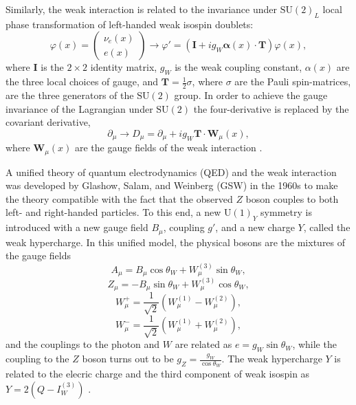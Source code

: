 Similarly, the weak interaction is related to the invariance under $\text{SU}(2)_L$ local
phase transformation of left-handed weak isospin doublets:
\begin{equation}
\varphi(x) = \begin{pmatrix} \nu_e(x) \\ e(x) \end{pmatrix} \rightarrow
\varphi' = (\mathbf{I} + i g_W \mathbf{\alpha}(x)\cdot\mathbf{T}) \varphi(x),
\end{equation}
where $\mathbf{I}$ is the $2\times2$ identity matrix, $g_W$ is the weak coupling constant,
$\alpha(x)$ are the three local choices of gauge, and $\mathbf{T} = \frac{1}{2}\sigma$,
where $\sigma$ are the Pauli spin-matrices, are the three generators of the $\text{SU}(2)$ group.
In order to achieve the gauge invariance of the Lagrangian under $\text{SU}(2)$ the four-derivative
is replaced by the covariant derivative,
\begin{equation}
\partial_\mu \rightarrow D_\mu = \partial_\mu + i g_W \mathbf{T} \cdot \mathbf{W}_\mu(x),
\end{equation}
where $\mathbf{W}_\mu(x)$ are the gauge fields of the weak interaction \cite{Thomson:2013zua}.

A unified theory of quantum electrodynamics (QED) and the weak interaction was developed
by Glashow, Salam, and Weinberg (GSW) in the 1960s \cite{Thomson:2013zua} to make the
theory compatible with the fact that the observed $Z$ boson couples to both left- and
right-handed particles. To this end, a new $\text{U}(1)_Y$ symmetry is introduced with a new gauge
field $B_\mu$, coupling $g'$, and a new charge $Y$, called the weak hypercharge. In this unified model,
the physical bosons are the mixtures of the gauge fields
\begin{equation}
A_\mu = B_\mu \cos\theta_W + W_\mu^{(3)} \sin{\theta_W},
\end{equation}
\begin{equation}
Z_\mu = - B_\mu \sin{\theta_W} + W_\mu^{(3)} \cos{\theta_W},
\end{equation}
\begin{equation}
W^+_\mu = \frac{1}{\sqrt{2}}\left( W_\mu^{(1)} - W_\mu^{(2)} \right),
\end{equation}
\begin{equation}
W^-_\mu = \frac{1}{\sqrt{2}}\left( W_\mu^{(1)} + W_\mu^{(2)} \right),
\end{equation}
and the couplings to the photon and $W$ are related as $e = g_W \sin{\theta_W}$,
while the coupling to the $Z$ boson turns out to be $g_Z  = \frac{g_W}{\cos{\theta_W}}$.
The weak hypercharge $Y$ is related to the elecric charge and the third component of weak
isospin as $Y = 2(Q - I_W^{(3)})$ \cite{Thomson:2013zua}.

